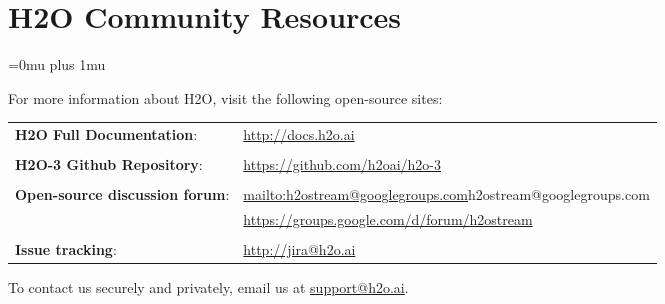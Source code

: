 \section{H2O Community Resources}
\Urlmuskip=0mu plus 1mu\relax %


For more information about H2O, visit the following open-source sites:

\begin{tabular}{l l}
{\textbf{H2O Full Documentation}}: & \url{http://docs.h2o.ai} \\
\\
{\textbf{H2O-3 Github Repository}}: & \url{https://github.com/h2oai/h2o-3} \\
\\
{\textbf{Open-source discussion forum}}: & \url{mailto:h2ostream@googlegroups.com}{h2ostream@googlegroups.com} \\
& \url{https://groups.google.com/d/forum/h2ostream} \\
\\
{\textbf{Issue tracking}}: & \url{http://jira@h2o.ai}
\end{tabular}

\bigskip

To contact us securely and privately, email us at \href{mailto:support@h2o.ai}{support@h2o.ai}.


